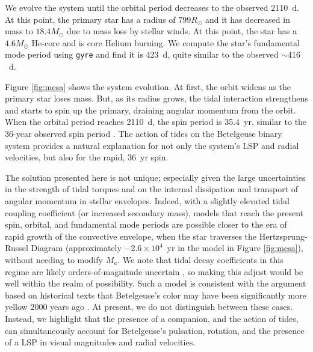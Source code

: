 \documentclass[twocolumn]{aastex631}
\begin{document}
We evolve the system until the orbital period decreases to the observed 2110~d. At this point, the primary star has a radius of $799R_\odot$ and it has decreased in mass to $18.4M_\odot$ due to mass loss by stellar winds. At this point, the star has a $4.6M_\odot$ He-core and is core Helium burning. We compute the star's fundamental mode period using {\tt gyre} \citep{2013MNRAS.435.3406T} and find it is 423~d, quite similar to the observed $\sim 416$~d. 

Figure \ref{fig:mesa} shows the system evolution. 
At first, the orbit widens as the primary star loses mass. But, as its radius grows, the tidal interaction strengthens and starts to spin up the primary, draining angular momentum from the orbit. When the orbital period reaches 2110~d, the spin period is 35.4~yr, similar to the 36-year observed spin period \citep{2018A&A...609A..67K}.  The action of tides on the Betelgeuse binary system provides a natural explanation for not only the system's LSP and radial velocities, but also for the rapid, $36$~yr spin. 

The solution presented here is not unique; especially given the large uncertainties in the strength of tidal torques and on the internal dissipation and transport of angular momentum in stellar envelopes. Indeed, with a slightly elevated tidal coupling coefficient (or increased secondary mass), models that reach the present spin, orbital, and fundamental mode periods are possible closer to the era of rapid growth of the convective envelope, when the star traverses the Hertzsprung-Russel Diagram (approximately $-2.6\times 10^4 $~yr in the model in Figure \ref{fig:mesa}), without needing to modify $M_a$. We note that tidal decay coefficients in this regime are likely orders-of-magnitude uncertain \citep{2014ARA&A..52..171O}, so making this adjust would be well within the realm of possibility. Such a model is consistent with the argument based on historical texts that Betelgeuse's color may have been significantly more yellow 2000 years ago \citep{2022MNRAS.516..693N,2023A&G....64.1.38N}. At present, we do not distinguish between these cases. Instead, we highlight that the presence of a companion, and the action of tides, can simultaneously account for  Betelgeuse's pulsation, rotation, and the presence of a LSP in visual magnitudes and radial velocities.  
\end{document}
